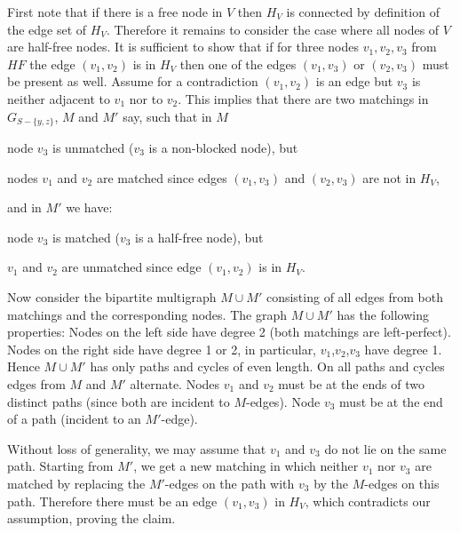 \let\accentvec\vec \documentclass{llncs}
\newenvironment{proof_claim}{\upshape{\textsc{Proof of Claim.}}} {\hfill\ensuremath{\square}\smallskip}
\newcommand{\graph}{\ensuremath{G}}
\begin{document}
\begin{proof_claim}
First note that if there is a free node in $V$ then $H_V$ is connected by definition of the edge set of $H_V$.
Therefore it remains to consider the case where all nodes of $V$ are half-free nodes.
It is sufficient to show that if for three nodes $v_1, v_2,v_3$ from $\mathit{HF}$ the edge $(v_1,v_2)$
is in $H_V$ then one of the edges $(v_1,v_3)$ or $(v_2,v_3)$ must be present as well.
Assume for a contradiction $(v_1,v_2)$ is an edge but $v_3$ is neither adjacent to $v_1$ nor to $v_2$.
This implies that there are two matchings in $\graph_{S-\{y,z\}}$, $M$ and $M'$ say,
such that in $M$
\begin{compactitem}
 \item node $v_3$ is unmatched ($v_3$ is a non-blocked node), but 
 \item nodes $v_1$ and $v_2$ are matched since edges $(v_1,v_3)$ and $(v_2,v_3)$ are not in $H_V$,
\end{compactitem}
and in $M'$ we have:
\begin{compactitem}
 \item node $v_3$ is matched ($v_3$ is a half-free node), but
 \item $v_1$ and $v_2$ are unmatched since edge $(v_1,v_2)$ is in $H_V$.
\end{compactitem}
Now consider the bipartite multigraph $M\cup M'$ consisting of all edges from both matchings and the corresponding nodes. The graph $M\cup M'$ has the following properties:
Nodes on the left side have degree 2 (both matchings are left-perfect). Nodes on the right side have degree 1 or 2, in particular, $v_1$,$v_2$,$v_3$ have degree 1. Hence $M\cup M'$ has only paths and cycles of even length. On all paths and cycles edges from $M$ and $M'$ alternate.
Nodes $v_1$ and $v_2$ must be at the ends of two distinct paths (since both are incident to $M$-edges). Node $v_3$ must be at the end of a path (incident to an $M'$-edge).

Without loss of generality, we may assume that $v_1$ and $v_3$ do not lie on the same path.
Starting from $M'$, we get a new matching in which neither $v_1$ nor $v_3$ are matched by
replacing the $M'$-edges on the path with $v_3$ by the $M$-edges on this path.
Therefore there must be an edge $(v_1,v_3)$ in $H_V$, which contradicts our assumption, proving the claim.
\end{proof_claim}
\end{document}
